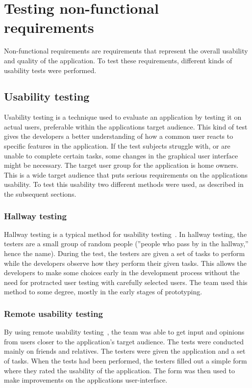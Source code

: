 \section{Testing non-functional requirements}
\label{sec:testingnonfunctionalrequirements}
Non-functional requirements are requirements that represent the overall usability and quality of the application. To test these requirements, different kinds of usability tests were performed.

\subsection{Usability testing}
\label{sec:userTest}
Usability testing is a technique used to evaluate an application by testing it on actual users, preferable within the applications target audience. This kind of test gives the developers a better understanding of how a common user reacts to specific features in the application. If the test subjects struggle with, or are unable to complete certain tasks, some changes in the graphical user interface might be necessary.
The target user group for the application is home owners. This is a wide target audience that puts serious requirements on the applications usability. To test this usability two different methods were used, as described in the subsequent sections.

\subsubsection{Hallway testing}
Hallway testing is a typical method for usability testing~\cite{hallwaytesting}. In hallway testing, the testers are a small group of random people (''people who pass by in the hallway,'' hence the name). During the test, the testers are given a set of tasks to perform while the developers observe how they perform their given tasks. This allows the developers to make some choices early in the development process without the need for protracted user testing with carefully selected users. 
The team used this method to some degree, mostly in the early stages of prototyping.

\subsubsection{Remote usability testing}
By using remote usability testing~\cite{remoteTest}, the team was able to get input and opinions from users closer to the application's target audience.
The tests were conducted mainly on friends and relatives. The testers were given the application and a set of tasks. When the tests had been performed, the testers filled out a simple form where they rated the usability of the application. The form was then used to make improvements on the applications user-interface.

